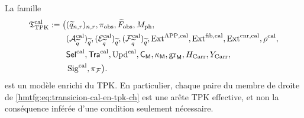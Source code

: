 \begin{proposition}
\label{hmtfg:prop:modelo-tpk-calibrado-ch}
La famille
\[
\begin{aligned}
 \mathfrak T_{\rm TPK}^{\rm cal}:=\bigl(
 &(\widetilde q_{n,r})_{n,r},\pi_{\rm obs},
   \widetilde F_{\rm obs},M_{\rm ph},\\
 &(\mathcal A_{\widetilde q}^{\rm cal})_{\widetilde q},
   (\mathcal E_{\widetilde q}^{\rm cal})_{\widetilde q},
   (\mathcal F_{\widetilde q}^{\rm cal})_{\widetilde q},
   \operatorname{Ext}^{\mathrm{APP},\rm cal},
   \operatorname{Ext}^{\rm fib,cal},
   \operatorname{Ext}^{\rm enr,cal},\rho^{\rm cal},\\
 &\mathsf{Sel}^{\rm cal},\mathsf{Tra}^{\rm cal},
   \operatorname{Upd}^{\rm cal},\mathsf C_{\mathsf M},
   \kappa_{\mathsf M},\operatorname{gr}_{\mathsf M},
   H_{\rm Carr},Y_{\rm Carr},\\
 &\operatorname{Sig}^{\rm cal},\pi_{\mathcal F}\bigr).
\end{aligned}
\]
est un modèle enrichi du TPK. En particulier, chaque paire du membre de droite de \eqref{hmtfg:eq:transicion-cal-en-tpk-ch} est une arête TPK effective, et non la conséquence inférée d'une condition seulement nécessaire.
\end{proposition}

